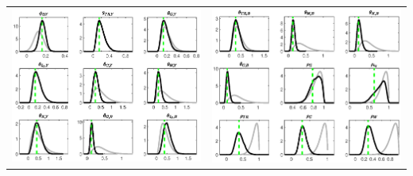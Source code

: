 \documentclass[a4paper,11pt]{article}
\numberwithin{equation}{section}
\begin{document}
\begin{minipage}{\linewidth}
{\begin{tabular}{p{10cm} p{10cm}}
	\includegraphics[width=10cm, trim =0 0 0.97cm 0]{SAFiscal_PriorsAndPosteriors5.eps} & \includegraphics[width=10cm, trim =0.97cm 0 0 0]{SAFiscal_PriorsAndPosteriors6.eps}\\
\end{tabular}
}
\end{minipage}
\end{document}
